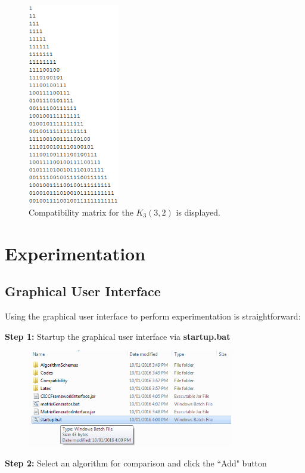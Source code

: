 \documentclass[titlepage]{article}
\begin{document}
\begin{figure}[H]
\centering
\includegraphics[width=40mm]{Images/CompatibilityMatrix.png}
\caption{Compatibility matrix for the $K_3(3,2)$ is displayed.}
\end{figure}

\section{Experimentation}

\subsection{Graphical User Interface}

Using the graphical user interface to perform experimentation is straightforward:

\textbf{Step 1:} Startup the graphical user interface via \textbf{startup.bat}

\begin{figure}[H]
\centering
\includegraphics[width=90mm]{Images/guiSteps/step1.png}
\end{figure}

\textbf{Step 2:} Select an algorithm for comparison and click the ``Add" button
\end{document}
